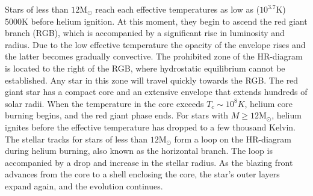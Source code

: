 Stars of less than $12$M$_{\odot}$ reach each effective temperatures as low as ($10^{3.7}$K) 5000K before helium ignition. At this moment, they begin to ascend the red giant branch (RGB), which is accompanied by a significant rise in luminosity and radius. Due to the low effective temperature the opacity of the envelope rises and the latter becomes gradually convective. The prohibited zone of the HR-diagram is located to the right of the RGB, where hydrostatic equilibrium cannot be established. Any star in this zone will travel quickly towards the RGB. The red giant star has a compact core and an extensive envelope that extends hundreds of solar radii. When the temperature in the core exceeds $T_c \sim 10^8 K$, helium core burning begins, and the red giant phase ends. For stars with $M \geq 12$M$_{\odot}$, helium ignites before the effective temperature has dropped to a few thousand Kelvin. The stellar tracks for stars of less than $12$M$_{\odot}$ form a loop on the HR-diagram during helium burning, also known as the horizontal branch. The loop is accompanied by a drop and increase in the stellar radius. As the blazing front advances from the core to a shell enclosing the core, the star's outer layers expand again, and the evolution continues.

